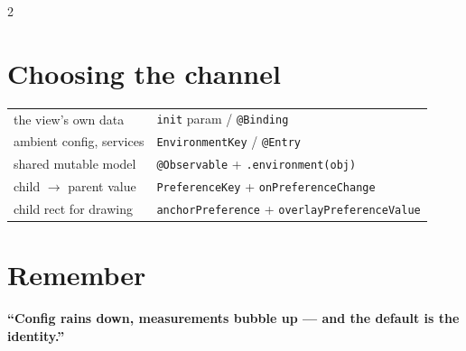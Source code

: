 \documentclass[8pt]{extarticle}
\begin{document}
\begin{multicols}{2}
\section{Choosing the channel}
{\footnotesize
\begin{tabular}{@{}>{\raggedright\arraybackslash}p{24mm}>{\raggedright\arraybackslash}p{48mm}@{}}
\toprule
the view's own data & \texttt{init} param / \texttt{@Binding} \\
ambient config, services & \texttt{EnvironmentKey} / \texttt{@Entry} \\
shared mutable model & \texttt{@Observable} + \texttt{.environment(obj)} \\
child $\to$ parent value & \texttt{PreferenceKey} + \texttt{onPreferenceChange} \\
child rect for drawing & \texttt{anchorPreference} + \texttt{overlayPreferenceValue} \\
\bottomrule
\end{tabular}}

\section{Remember}
\textbf{``Config rains down, measurements bubble up — and the default is the identity.''}


\end{multicols}

\end{document}
